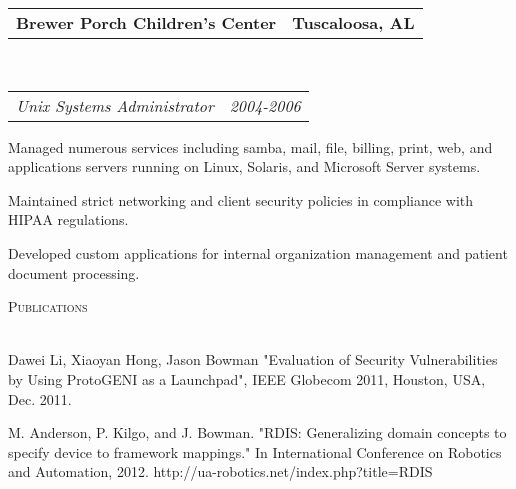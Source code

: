 \documentclass[10pt,letterpaper]{article}
\makeatletter
\newcommand{\lineunder}{\vspace*{-8pt} \\ \hspace*{-18pt} \hrulefill \\}
\newcommand{\header}[1]{{\hspace*{-15pt}\vspace*{6pt} \textsc{#1}} \vspace*{-6pt} \lineunder}
\newcommand{\headerrow}[2]
{\begin{tabular*}{\linewidth}{l@{\extracolsep{\fill}}r}
	#1 &
	#2 \\
\end{tabular*}}
\newcommand{\employment}[5]{
	\headerrow
		{\textbf{#1}}
		{\textbf{#2}}
	\\
	\headerrow
		{\emph{#3}}
		{\emph{#4}}
	\begin{itemize*}
		\item #5
	\end{itemize*}
}
\makeatother
\begin{document}

\employment{Brewer Porch Children's Center}{Tuscaloosa, AL}{Unix Systems Administrator}{2004-2006}{
Managed numerous services including samba, mail, file, billing, print, web, and applications servers running on Linux, Solaris, and Microsoft Server systems.
\item Maintained strict networking and client security policies in compliance with HIPAA regulations.
\item Developed custom applications for internal organization management and patient document processing.
}
\vspace*{3pt}
\header{Publications}
\begin{itemize*}
\item Dawei Li, Xiaoyan Hong, Jason Bowman "Evaluation of Security Vulnerabilities by Using ProtoGENI as a Launchpad", IEEE Globecom 2011, Houston, USA, Dec. 2011.
\item M. Anderson, P. Kilgo, and J. Bowman. "RDIS: Generalizing domain concepts to specify device to framework mappings." In International Conference on Robotics and Automation, 2012. http://ua-robotics.net/index.php?title=RDIS
\end{itemize*}
\vspace*{8pt}

	
\end{document}
